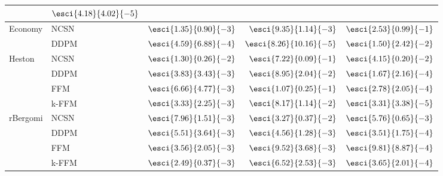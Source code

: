 \begin{table}[t]
{\begin{tabular}{llrrr}
 & \cellcolor[gray]{0.9}\textcolor{ForestGreen}{\textbf{$\esci{4.18}{4.02}{-5}$}} \\
\midrule
\multirow{2}{*}{Economy}
 & NCSN
 & \textcolor{Orange}{\textbf{$\esci{1.35}{0.90}{-3}$}}
 & \textcolor{Orange}{\textbf{$\esci{9.35}{1.14}{-3}$}}
 & \textcolor{Orange}{\textbf{$\esci{2.53}{0.99}{-1}$}} \\
 & DDPM
 & \textcolor{ForestGreen}{\textbf{$\esci{4.59}{6.88}{-4}$}}
 & \textcolor{ForestGreen}{\textbf{$\esci{8.26}{10.16}{-5}$}}
 & \textcolor{ForestGreen}{\textbf{$\esci{1.50}{2.42}{-2}$}} \\
\midrule
\multirow{4}{*}{Heston}
 & NCSN
 & $\esci{1.30}{0.26}{-2}$
 & $\esci{7.22}{0.09}{-1}$
 & $\esci{4.15}{0.20}{-2}$ \\
 & DDPM
 & \textcolor{Orange}{\textbf{$\esci{3.83}{3.43}{-3}$}}
 & \textcolor{Orange}{\textbf{$\esci{8.95}{2.04}{-2}$}}
 & \textcolor{Orange}{\textbf{$\esci{1.67}{2.16}{-4}$}} \\
 & FFM
 & $\esci{6.66}{4.77}{-3}$
 & $\esci{1.07}{0.25}{-1}$
 & $\esci{2.78}{2.05}{-4}$ \\
 & k-FFM
 & \cellcolor[gray]{0.9}\textcolor{ForestGreen}{\textbf{$\esci{3.33}{2.25}{-3}$}}
 & \cellcolor[gray]{0.9}\textcolor{ForestGreen}{\textbf{$\esci{8.17}{1.14}{-2}$}}
 & \cellcolor[gray]{0.9}\textcolor{ForestGreen}{\textbf{$\esci{3.31}{3.38}{-5}$}} \\
\midrule
\multirow{4}{*}{rBergomi}
 & NCSN
 & $\esci{7.96}{1.51}{-3}$
 & $\esci{3.27}{0.37}{-2}$
 & $\esci{5.76}{0.65}{-3}$ \\
 & DDPM
 & $\esci{5.51}{3.64}{-3}$
 & \textcolor{ForestGreen}{\textbf{$\esci{4.56}{1.28}{-3}$}}
 & \textcolor{ForestGreen}{\textbf{$\esci{3.51}{1.75}{-4}$}} \\
 & FFM
 & \textcolor{Orange}{\textbf{$\esci{3.56}{2.05}{-3}$}}
 & $\esci{9.52}{3.68}{-3}$
 & $\esci{9.81}{8.87}{-4}$ \\
 & k-FFM
 & \cellcolor[gray]{0.9}\textcolor{ForestGreen}{\textbf{$\esci{2.49}{0.37}{-3}$}}
 & \cellcolor[gray]{0.9}\textcolor{Orange}{\textbf{$\esci{6.52}{2.53}{-3}$}}
 & \cellcolor[gray]{0.9}\textcolor{Orange}{\textbf{$\esci{3.65}{2.01}{-4}$}} \\
\bottomrule
\end{tabular}
} %
\end{table}
